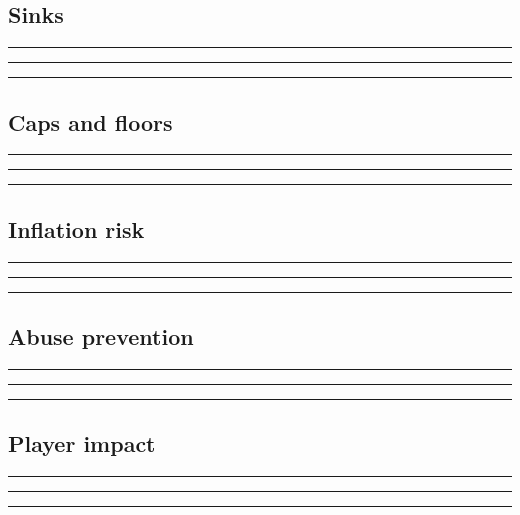 \documentclass[11pt]{article}
\begin{document}
\subsection{Sinks}
\noindent\rule{\linewidth}{0.3pt}\par\vspace{0.18in}
\noindent\rule{\linewidth}{0.3pt}\par\vspace{0.18in}
\noindent\rule{\linewidth}{0.3pt}\par\vspace{0.14in}

\subsection{Caps and floors}
\noindent\rule{\linewidth}{0.3pt}\par\vspace{0.18in}
\noindent\rule{\linewidth}{0.3pt}\par\vspace{0.18in}
\noindent\rule{\linewidth}{0.3pt}\par\vspace{0.14in}

\subsection{Inflation risk}
\noindent\rule{\linewidth}{0.3pt}\par\vspace{0.18in}
\noindent\rule{\linewidth}{0.3pt}\par\vspace{0.18in}
\noindent\rule{\linewidth}{0.3pt}\par\vspace{0.14in}

\subsection{Abuse prevention}
\noindent\rule{\linewidth}{0.3pt}\par\vspace{0.18in}
\noindent\rule{\linewidth}{0.3pt}\par\vspace{0.18in}
\noindent\rule{\linewidth}{0.3pt}\par\vspace{0.14in}

\subsection{Player impact}
\noindent\rule{\linewidth}{0.3pt}\par\vspace{0.18in}
\noindent\rule{\linewidth}{0.3pt}\par\vspace{0.18in}
\noindent\rule{\linewidth}{0.3pt}\par\vspace{0.14in}
\end{document}
